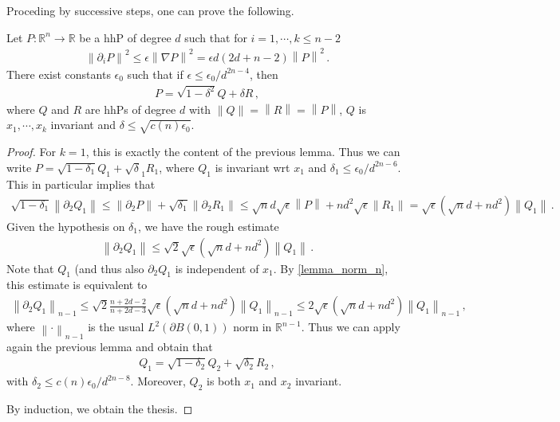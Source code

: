 \documentclass[11pt]{article}
\begin{document}
Proceding by successive steps, one can prove the following.
\begin{proposition}\label{prop_poly2}
 Let $P:{\mathbb{R}}^n\to {\mathbb{R}}$ be a hhP of degree $d$ such that for $i=1,\cdots,k\leq n-2$
 \begin{gather}
  {\left\|{\partial_i P}\right\|}^2\leq \epsilon {\left\|{\nabla P}\right\|}^2 = \epsilon d(2d+n-2) {\left\|{P}\right\|}^2\, .
 \end{gather}
There exist constants $\epsilon_0$ such that if $\epsilon\leq \epsilon_0/d^{2n-4}$, then
\begin{gather}
 P = \sqrt{1-\delta^2} Q + \delta R\, ,
\end{gather}
where $Q$ and $R$ are hhPs of degree $d$ with ${\left\|Q\right\|} = {\left\|R\right\|} = {\left\|P\right\|}$, $Q$ is $x_1,\cdots,x_k$ invariant and $\delta\leq \sqrt {c(n)\epsilon_0}$.
\end{proposition}
\begin{proof}
 For $k=1$, this is exactly the content of the previous lemma. Thus we can write $P=\sqrt{1-\delta_1}Q_1+\sqrt \delta_1 R_1$, where $Q_1$ is invariant wrt $x_1$ and $\delta_1\leq \epsilon_0/d^{2n-6}$. This in particular implies that
 \begin{gather}
  \sqrt{1-\delta_1}{\left\|{\partial_2 Q_1}\right\|} \leq {\left\|{\partial_2 P}\right\|} + \sqrt{\delta_1} {\left\|{\partial_2 R_1}\right\|}\leq \sqrt{n}d\sqrt{\epsilon}  {\left\|P\right\|} + nd^2\sqrt{\epsilon} {\left\|{R_1}\right\|} = \sqrt{\epsilon}{\left({\sqrt{n}d  + nd^2}\right)}{\left\|{Q_1}\right\|}\, . 
 \end{gather}
Given the hypothesis on $\delta_1$, we have the rough estimate
\begin{gather}
 {\left\|{\partial_2 Q_1}\right\|} \leq \sqrt 2 \sqrt{\epsilon}{\left({\sqrt{n}d  + nd^2}\right)}{\left\|{Q_1}\right\|}\, .
\end{gather}
Note that $Q_1$ (and thus also $\partial_2 Q_1$ is independent of $x_1$. By \ref{lemma_norm_n}, this estimate is equivalent to
\begin{gather}
 {\left\|{\partial_2 Q_1}\right\|}_{n-1} \leq \sqrt 2 \frac{n+2d-2}{n+2d-3} \sqrt{\epsilon}{\left({\sqrt{n}d  + nd^2}\right)}{\left\|{Q_1}\right\|}_{n-1}\leq 2\sqrt{\epsilon}{\left({\sqrt{n}d  + nd^2}\right)}{\left\|{Q_1}\right\|}_{n-1}\, ,
\end{gather}
where ${\left\|{\cdot}\right\|}_{n-1}$ is the usual $L^2(\partial B(0,1))$ norm in ${\mathbb{R}}^{n-1}$. Thus we can apply again the previous lemma and obtain that
\begin{gather}
 Q_1=\sqrt{1-\delta_2}Q_2+\sqrt{\delta_2} R_2\, ,
\end{gather}
with $\delta_2\leq c(n) \epsilon_0 /d^{2n-8}$. Moreover, $Q_2$ is both $x_1$ and $x_2$ invariant.

By induction, we obtain the thesis.
\end{proof}
\end{document}
